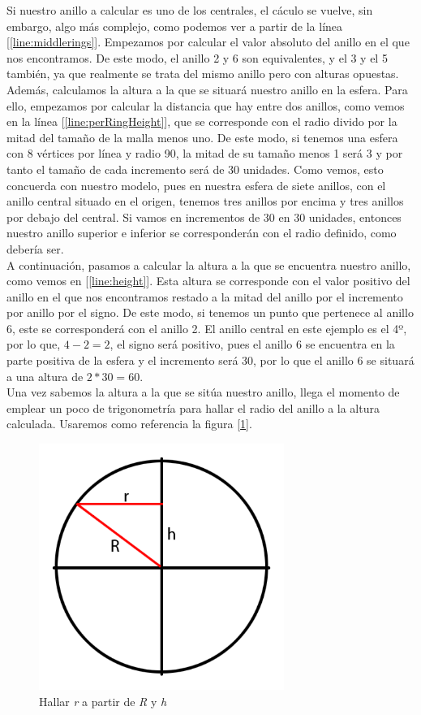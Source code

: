 Si nuestro anillo a calcular es uno de los centrales, el cáculo se vuelve, sin embargo, algo más complejo, como podemos ver a partir de la línea [\ref{line:middlerings}]. Empezamos por calcular el valor absoluto del anillo en el que nos encontramos. De este modo, el anillo 2 y 6 son equivalentes, y el 3 y el 5 también, ya que realmente se trata del mismo anillo pero con alturas opuestas. Además, calculamos la altura a la que se situará nuestro anillo en la esfera. Para ello, empezamos por calcular la distancia que hay entre dos anillos, como vemos en la línea [\ref{line:perRingHeight}], que se corresponde con el radio divido por la mitad del tamaño de la malla menos uno. De este modo, si tenemos una esfera con 8 vértices por línea y radio 90, la mitad de su tamaño menos 1 será 3 y por tanto el tamaño de cada incremento será de 30 unidades. Como vemos, esto concuerda con nuestro modelo, pues en nuestra esfera de siete anillos, con el anillo central situado en el origen, tenemos tres anillos por encima y tres anillos por debajo del central. Si vamos en incrementos de 30 en 30 unidades, entonces nuestro anillo superior e inferior se corresponderán con el radio definido, como debería ser.\\

A continuación, pasamos a calcular la altura a la que se encuentra nuestro anillo, como vemos en [\ref{line:height}]. Esta altura se corresponde con el valor positivo del anillo en el que nos encontramos restado a la mitad del anillo por el incremento por anillo por el signo. De este modo, si tenemos un punto que pertenece al anillo 6, este se corresponderá con el anillo 2. El anillo central en este ejemplo es el 4º, por lo que, \(4 - 2 = 2\), el signo será positivo, pues el anillo 6 se encuentra en la parte positiva de la esfera y el incremento será 30, por lo que el anillo 6 se situará a una altura de \(2 * 30 = 60\).\\

Una vez sabemos la altura a la que se sitúa nuestro anillo, llega el momento de emplear un poco de trigonometría para hallar el radio del anillo a la altura calculada. Usaremos como referencia la figura [\ref{fig:sphereTrigo}].\\

\begin{figure}[h]
	\centering
	\includegraphics[width=8cm]{archivos/sphereTrigo}
	\caption{Hallar \emph{r} a partir de \emph{R} y \emph{h}}
	\label{fig:sphereTrigo}
\end{figure}

